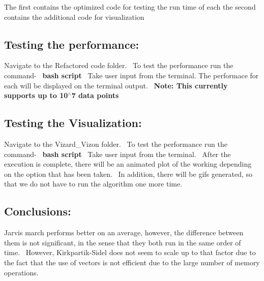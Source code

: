 The first contains the optimized code for testing the run time of each the second contains the additional code for visualization \hypertarget{index_step1}{}\subsection{Testing the performance\+:}\label{index_step1}
Navigate to the Refactored code folder.~\newline
 To test the performance run the command-\/~\newline
 {\bfseries bash script}~\newline
 Take user input from the terminal. The performace for each will be displayed on the terminal output.~\newline
 {\bfseries Note\+: This currently supports up to 10$^\wedge$7 data points} \hypertarget{index_step2}{}\subsection{Testing the Visualization\+:}\label{index_step2}
Navigate to the Vizard\+\_\+\+Vizon folder.~\newline
 To test the performance run the command-\/~\newline
 {\bfseries bash script}~\newline
 Take user input from the terminal.~\newline
 After the execution is complete, there will be an animated plot of the working depending on the option that has been taken.~\newline
 In addition, there will be gifs generated, so that we do not have to run the algorithm one more time.~\newline
 \hypertarget{index_step3}{}\subsection{Conclusions\+:}\label{index_step3}
Jarvis march performs better on an average, however, the difference between them is not significant, in the sense that they both run in the same order of time.~\newline
 However, Kirkpartik-\/\+Sidel does not seem to scale up to that factor due to the fact that the use of vectors is not efficient due to the large number of memory operations. 